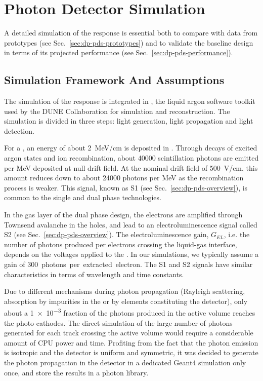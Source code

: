\section{Photon Detector Simulation}
\label{sec:dp-pds-simulation}

A detailed simulation of the  response is essential both to compare with data from  prototypes (see Sec.~\ref{sec:dp-pds-prototypes}) and to validate the  baseline design in terms of its projected performance (see Sec.~\ref{sec:dp-pds-performance}).


\subsection{Simulation Framework And Assumptions}
\label{subsec:dp-pds-simulation_assumptions}

The simulation of the  response is integrated in , the liquid argon software toolkit used by the DUNE Collaboration for simulation and reconstruction. The simulation is divided in three steps: light generation, light propagation and light detection.

For a , an energy of about \SI{2}{\MeV/\cm} is deposited in . 
Through decays of excited argon states and ion recombination, about \num{40000} scintillation photons are emitted per \si{\MeV} deposited at null drift field. At the nominal drift field of \SI{500}{\V/\cm}, this amount reduces down to about \num{24000} photons per \si{\MeV} as the recombination process is weaker. 
This signal, known as S1 (see Sec.~\ref{sec:dp-pds-overview}), is common to the single and dual phase technologies.

In the gas layer of the dual phase design, the electrons are amplified through Townsend avalanche in the  holes, and lead to an electroluminescence signal called S2 (see Sec.~\ref{sec:dp-pds-overview}). The electroluminescence gain, $G_{EL}$, i.e. the number of photons produced per electrons crossing the liquid-gas interface, depends on the voltages applied to the . In our simulations, we typically assume a gain of \SI{300}{photons per extracted electron}. The S1 and S2 signals have similar characteristics in terms of wavelength and time constants. 

Due to different mechanisms during photon propagation (Rayleigh scattering, absorption by impurities in the \lar or by elements constituting the detector), only about a \num{1e-3} fraction of the photons produced in the \lar active volume reaches the  photo-cathodes. The direct simulation of the large number of photons generated for each track crossing the active volume would require a considerable amount of CPU power and time. Profiting from the fact that the photon emission is isotropic and the detector is uniform and symmetric, it was decided to generate the photon propagation in the detector in a dedicated Geant4 simulation only once, and store the results in a photon library.

